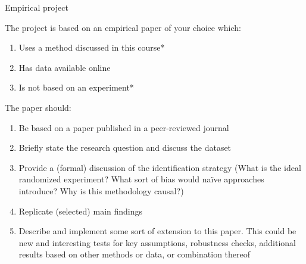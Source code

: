 \documentclass[handout, 8pt]{beamer}
\begin{document}
\begin{frame}{Empirical project}

The project is based on an empirical paper of your choice which:
\begin{enumerate}
     \item Uses a method discussed in this course*
     \item Has data available online
     \item Is not based on an experiment*
 \end{enumerate} 
 

\vspace{2ex}
The paper should:
\begin{enumerate}
    \item Be based on a paper published in a peer-reviewed journal
    \item Briefly state the research question and discuss the dataset 
    \item Provide a (formal) discussion of the identification strategy (What is the ideal randomized experiment? What sort of bias would na{\"i}ve  approaches introduce? Why is this methodology causal?)
    \item Replicate (selected) main findings
    \item Describe and implement some sort of extension to this paper. This could be new and interesting tests for key assumptions, robustness checks, additional results based on other methods or data, or combination thereof
\end{enumerate}

\end{frame}
\end{document}
